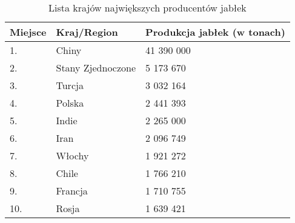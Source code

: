 \begin{table}[htbp]
\centering
\begin{tabular}{|l|l|l|}
\hline
Miejsce & Kraj/Region       & Produkcja jabłek (w tonach) \\ \hline
1.      & Chiny             & 41 390 000                  \\ \hline
2.      & Stany Zjednoczone & 5 173 670                   \\ \hline
3.      & Turcja            & 3 032 164                   \\ \hline
4.      & Polska            & 2 441 393                   \\ \hline
5.      & Indie             & 2 265 000                   \\ \hline
6.      & Iran              & 2 096 749                   \\ \hline
7.      & Włochy            & 1 921 272                   \\ \hline
8.      & Chile             & 1 766 210                   \\ \hline
9.      & Francja           & 1 710 755                   \\ \hline
10.     & Rosja             & 1 639 421                   \\ \hline
\end{tabular}
\label{tab:jablka}
\caption{Lista krajów największych producentów jabłek}
\end{table}
